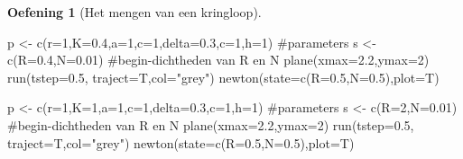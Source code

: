 \documentclass[
  a4paper,
]{scrbook}
\newenvironment{Shaded}{\begin{snugshade}}{\end{snugshade}}
\newcommand{\AttributeTok}[1]{\textcolor[rgb]{0.40,0.45,0.13}{#1}}
\newcommand{\CommentTok}[1]{\textcolor[rgb]{0.37,0.37,0.37}{#1}}
\newcommand{\DecValTok}[1]{\textcolor[rgb]{0.68,0.00,0.00}{#1}}
\newcommand{\FloatTok}[1]{\textcolor[rgb]{0.68,0.00,0.00}{#1}}
\newcommand{\FunctionTok}[1]{\textcolor[rgb]{0.28,0.35,0.67}{#1}}
\newcommand{\NormalTok}[1]{\textcolor[rgb]{0.00,0.23,0.31}{#1}}
\newcommand{\OtherTok}[1]{\textcolor[rgb]{0.00,0.23,0.31}{#1}}
\newcommand{\StringTok}[1]{\textcolor[rgb]{0.13,0.47,0.30}{#1}}
\theoremstyle{definition}
\newtheorem{exercise}{Oefening}[chapter]
\theoremstyle{remark}
\begin{document}
\begin{exercise}[Het mengen van een
kringloop]
\begin{Shaded}
\begin{Highlighting}[]
\NormalTok{p }\OtherTok{\textless{}{-}} \FunctionTok{c}\NormalTok{(}\AttributeTok{r=}\DecValTok{1}\NormalTok{,}\AttributeTok{K=}\FloatTok{0.4}\NormalTok{,}\AttributeTok{a=}\DecValTok{1}\NormalTok{,}\AttributeTok{c=}\DecValTok{1}\NormalTok{,}\AttributeTok{delta=}\FloatTok{0.3}\NormalTok{,}\AttributeTok{c=}\DecValTok{1}\NormalTok{,}\AttributeTok{h=}\DecValTok{1}\NormalTok{)  }\CommentTok{\#parameters}
\NormalTok{s }\OtherTok{\textless{}{-}} \FunctionTok{c}\NormalTok{(}\AttributeTok{R=}\FloatTok{0.4}\NormalTok{,}\AttributeTok{N=}\FloatTok{0.01}\NormalTok{) }\CommentTok{\#begin{-}dichtheden van R en N  }
\FunctionTok{plane}\NormalTok{(}\AttributeTok{xmax=}\FloatTok{2.2}\NormalTok{,}\AttributeTok{ymax=}\DecValTok{2}\NormalTok{)}
\FunctionTok{run}\NormalTok{(}\AttributeTok{tstep=}\FloatTok{0.5}\NormalTok{, }\AttributeTok{traject=}\NormalTok{T,}\AttributeTok{col=}\StringTok{"grey"}\NormalTok{)}
\FunctionTok{newton}\NormalTok{(}\AttributeTok{state=}\FunctionTok{c}\NormalTok{(}\AttributeTok{R=}\FloatTok{0.5}\NormalTok{,}\AttributeTok{N=}\FloatTok{0.5}\NormalTok{),}\AttributeTok{plot=}\NormalTok{T)}

\NormalTok{p }\OtherTok{\textless{}{-}} \FunctionTok{c}\NormalTok{(}\AttributeTok{r=}\DecValTok{1}\NormalTok{,}\AttributeTok{K=}\DecValTok{1}\NormalTok{,}\AttributeTok{a=}\DecValTok{1}\NormalTok{,}\AttributeTok{c=}\DecValTok{1}\NormalTok{,}\AttributeTok{delta=}\FloatTok{0.3}\NormalTok{,}\AttributeTok{c=}\DecValTok{1}\NormalTok{,}\AttributeTok{h=}\DecValTok{1}\NormalTok{)  }\CommentTok{\#parameters}
\NormalTok{s }\OtherTok{\textless{}{-}} \FunctionTok{c}\NormalTok{(}\AttributeTok{R=}\DecValTok{2}\NormalTok{,}\AttributeTok{N=}\FloatTok{0.01}\NormalTok{) }\CommentTok{\#begin{-}dichtheden van R en N  }
\FunctionTok{plane}\NormalTok{(}\AttributeTok{xmax=}\FloatTok{2.2}\NormalTok{,}\AttributeTok{ymax=}\DecValTok{2}\NormalTok{)}
\FunctionTok{run}\NormalTok{(}\AttributeTok{tstep=}\FloatTok{0.5}\NormalTok{, }\AttributeTok{traject=}\NormalTok{T,}\AttributeTok{col=}\StringTok{"grey"}\NormalTok{)}
\FunctionTok{newton}\NormalTok{(}\AttributeTok{state=}\FunctionTok{c}\NormalTok{(}\AttributeTok{R=}\FloatTok{0.5}\NormalTok{,}\AttributeTok{N=}\FloatTok{0.5}\NormalTok{),}\AttributeTok{plot=}\NormalTok{T)}


\end{Highlighting}
\end{Shaded}
\end{exercise}
\end{document}
